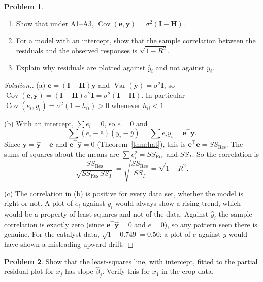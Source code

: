 \documentclass[11pt,a4paper]{article}
\numberwithin{equation}{section}
\theoremstyle{definition}
\newtheorem{problemx}{Problem}[subsection]
\newenvironment{problem}{\begin{problemx}}{\end{problemx}}
\newenvironment{solution}
  {\renewcommand{\qedsymbol}{}\begin{proof}[\textit{Solution}.]}
  {\end{proof}}
\begin{document}
\begin{problem}\label{prob:e-vs-y}
\begin{enumerate}[label=(\alph*)]
\item Show that under A1--A3, $\operatorname{Cov}(\mathbf{e}, \mathbf{y}) = \sigma^2(\mathbf{I} - \mathbf{H})$.
\item For a model with an intercept, show that the sample correlation between the
residuals and the observed responses is $\sqrt{1 - R^2}$.
\item Explain why residuals are plotted against $\hat y_i$ and not against $y_i$.
\end{enumerate}
\end{problem}

\begin{solution}
(a) $\mathbf{e} = (\mathbf{I} - \mathbf{H})\mathbf{y}$ and $\operatorname{Var}(\mathbf{y}) = \sigma^2\mathbf{I}$, so
$\operatorname{Cov}(\mathbf{e}, \mathbf{y}) = (\mathbf{I} - \mathbf{H})\sigma^2\mathbf{I} = \sigma^2(\mathbf{I} - \mathbf{H})$.
In particular $\operatorname{Cov}(e_i, y_i) = \sigma^2(1 - h_{ii}) > 0$ whenever $h_{ii} < 1$.

(b) With an intercept, $\sum e_i = 0$, so $\bar e = 0$ and
\[
\sum (e_i - \bar e)(y_i - \bar y) = \sum e_i y_i = \mathbf{e}^\top\mathbf{y} .
\]
Since $\mathbf{y} = \hat{\mathbf{y}} + \mathbf{e}$ and $\mathbf{e}^\top\hat{\mathbf{y}} = 0$
(Theorem~\ref{thm:hat}), this is $\mathbf{e}^\top\mathbf{e} = SS_{\mathrm{Res}}$. The sums of
squares about the means are $\sum e_i^2 = SS_{\mathrm{Res}}$ and $SS_T$. So the correlation is
\[
\frac{SS_{\mathrm{Res}}}{\sqrt{SS_{\mathrm{Res}}\, SS_T}} = \sqrt{\frac{SS_{\mathrm{Res}}}{SS_T}} = \sqrt{1 - R^2} .
\]

(c) The correlation in (b) is positive for every data set, whether the model is right or
not. A plot of $e_i$ against $y_i$ would always show a rising trend, which would be a
property of least squares and not of the data. Against $\hat y_i$ the sample correlation is
exactly zero (since $\mathbf{e}^\top\hat{\mathbf{y}} = 0$ and $\bar e = 0$), so any pattern seen
there is genuine. For the catalyst data, $\sqrt{1 - 0.749} = 0.50$: a plot of $e$ against
$y$ would have shown a misleading upward drift.
\end{solution}

\begin{problem}\label{prob:partial-resid}
Show that the least-squares line, with intercept, fitted to the partial residual plot for
$x_j$ has slope $\hat\beta_j$. Verify this for $x_1$ in the crop data.
\end{problem}
\end{document}
